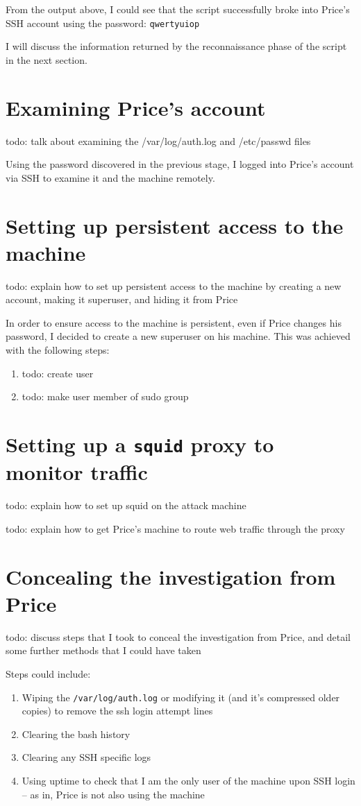 \documentclass[12pt]{report}
\begin{document}
From the output above, I could see that the script successfully broke into Price's SSH account using the password: \texttt{qwertyuiop}

I will discuss the information returned by the reconnaissance phase of the script in the next section.

\section{Examining Price's account}
todo: talk about examining the /var/log/auth.log and /etc/passwd files

Using the password discovered in the previous stage, I logged into Price's account via SSH to examine it and the machine remotely.

\section{Setting up persistent access to the machine}
todo: explain how to set up persistent access to the machine by creating a new account, making it superuser, and hiding it from Price

In order to ensure access to the machine is persistent, even if Price changes his password, I decided to create a new superuser on his machine. This was achieved with the following steps:
\begin{enumerate}
  \item todo: create user
  \item todo: make user member of sudo group
\end{enumerate}

\section{Setting up a \texttt{squid} proxy to monitor traffic}
todo: explain how to set up squid on the attack machine

todo: explain how to get Price's machine to route web traffic through the proxy

\section{Concealing the investigation from Price}
todo: discuss steps that I took to conceal the investigation from Price, and detail some further methods that I could have taken

Steps could include:
\begin{enumerate}
  \item Wiping the \texttt{/var/log/auth.log} or modifying it (and it's compressed older copies) to remove the ssh login attempt lines
  \item Clearing the bash history
  \item Clearing any SSH specific logs
  \item Using uptime to check that I am the only user of the machine upon SSH login -- as in, Price is not also using the machine
\end{enumerate}
\end{document}
